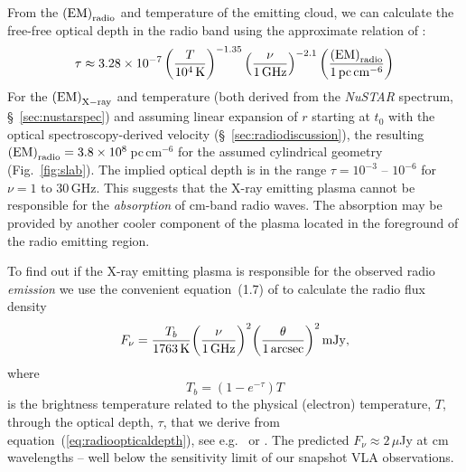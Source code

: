 \documentclass[a4paper,fleqn,usenatbib]{mnras}
\begin{document}
From the ${\rm (EM)}_{\rm radio}$ and temperature of the emitting cloud,
we can calculate the free-free optical depth in the radio band using the approximate relation of
\cite{1967ApJ...147..471M}:
\begin{equation}
\tau \approx 3.28 \times 10^{-7} \left( \frac{T}{10^4\,{\rm K}} \right)^{-1.35}  \left( \frac{\nu}{1\,{\rm GHz}} \right)^{-2.1}  \left( \frac{ {\rm (EM)}_{\rm radio} }{1\,{\rm pc}\,{\rm cm}^{-6}} \right)
\label{eq:radioopticaldepth}
\end{equation}
For the ${\rm (EM)}_{\rm X-ray}$ and temperature (both derived from the {\em NuSTAR}
spectrum, \S~\ref{sec:nustarspec}) 
and assuming linear expansion of $r$ starting at $t_0$ with the optical
spectroscopy-derived velocity (\S~\ref{sec:radiodiscussion}), the resulting ${\rm (EM)}_{\rm radio} = 3.8 \times 10^8$\,pc\,cm$^{-6}$ for the assumed cylindrical geometry (Fig.~\ref{fig:slab}).
The implied optical depth is in the range $\tau = 10^{-3}$ -- $10^{-6}$ for $\nu = 1$ to 30\,GHz.
This suggests that the X-ray emitting plasma 
cannot be responsible for the {\it absorption} of cm-band radio waves. 
The absorption may be provided by another cooler component of the plasma located in the foreground of the radio emitting region.

To find out if the X-ray emitting plasma is responsible for the observed
radio {\it emission} we use the convenient equation~(1.7) of \cite{2016PhDT........30W} to calculate the radio flux density
\begin{equation}
F_\nu = \frac{T_b}{1763\,{\rm K}} \bigg(\frac{\nu}{1\,{\rm GHz}}\bigg)^2 \bigg(\frac{\theta}{1\,{\rm arcsec}}\bigg)^2\,{\rm mJy},
\label{eq:radioflux}
\end{equation}
where 
\begin{equation}
T_b = (1 - e^{-\tau}) T
\label{eq:TbT}
\end{equation}
is the brightness temperature related to the physical (electron) temperature, $T$, 
through the optical depth, $\tau$, that we derive from
equation~(\ref{eq:radioopticaldepth}), see e.g.~\cite{1979rpa..book.....R} or
\cite{SnellKurtzMarr}. 
The predicted $F_\nu \approx 2\,\mu$Jy at cm wavelengths -- well below the sensitivity limit of our snapshot VLA observations.
\end{document}
